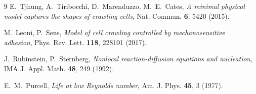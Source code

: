 \documentclass[11pt]{article}
\begin{document}
\begin{thebibliography}{9}
E.~Tjhung, A.~Tiribocchi, D.~Marenduzzo, M.~E.~Cates,
\emph{A minimal physical model captures the shapes of crawling cells},
Nat. Commun. \textbf{6}, 5420 (2015).

M.~Leoni, P.~Sens,
\emph{Model of cell crawling controlled by mechanosensitive adhesion},
Phys. Rev. Lett. \textbf{118}, 228101 (2017).

J.~Rubinstein, P.~Sternberg,
\emph{Nonlocal reaction-diffusion equations and nucleation},
IMA J. Appl. Math. \textbf{48}, 249 (1992).

E.~M.~Purcell,
\emph{Life at low Reynolds number},
Am. J. Phys. \textbf{45}, 3 (1977).
\end{thebibliography}
\end{document}
